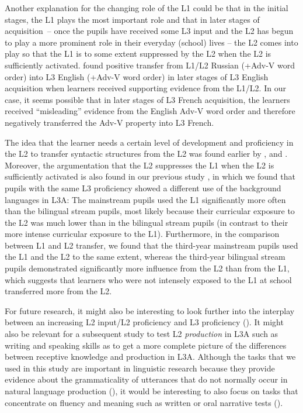 \documentclass[output=paper]{langsci/langscibook}
\begin{document}
Another explanation for the changing role of the L1 could be that in the initial stages, the L1 plays the most important role and that in later stages of acquisition~– once the pupils have received some L3 input and the L2 has begun to play a more prominent role in their everyday (school) lives – the L2 comes into play so that the L1 is to some extent suppressed by the L2 when the L2 is sufficiently activated. \citet{WestergaardEtAl2016} found positive transfer from L1/L2 Russian (+Adv-V word order) into L3 English (+Adv-V word order) in later stages of L3 English acquisition when learners received supporting evidence from the L1/L2. In our case, it seems possible that in later stages of L3 French acquisition, the learners received ``misleading'' evidence from the English Adv-V word order and therefore negatively transferred the Adv-V property into L3 French.

The idea that the learner needs a certain level of development and proficiency in the L2 to transfer syntactic structures from the L2 was found earlier by \citet{BardelFalk2007}, \citet{SánchezBardel2017} and . Moreover, the argumentation that the L2 suppresses the L1 when the L2 is sufficiently activated is also found in our previous study \citep{StadtEtAl2016}, in which we found that pupils with the same L3 proficiency showed a different use of the background languages in L3A: The mainstream pupils used the L1 significantly more often than the bilingual stream pupils, most likely because their curricular exposure to the L2 was much lower than in the bilingual stream pupils (in contrast to their more intense curricular exposure to the L1). Furthermore, in the comparison between L1 and L2 transfer, we found that the third-year mainstream pupils used the L1 and the L2 to the same extent, whereas the third-year bilingual stream pupils demonstrated significantly more influence from the L2 than from the L1, which suggests that learners who were not intensely exposed to the L1 at school transferred more from the L2.

For future research, it might also be interesting to look further into the interplay between an increasing L2 input/L2 proficiency and L3 proficiency (\citealt{BardelLindqvist2007, SánchezBardel2017}). It might also be relevant for a subsequent study to test L2 \textit{production} in L3A such as writing and speaking skills as to get a more complete picture of the differences between receptive knowledge and production in L3A. Although the tasks that we used in this study are important in linguistic research because they provide evidence about the grammaticality of utterances that do not normally occur in natural language production (\citealt{SchützeSprouse2014}), it would be interesting to also focus on tasks that concentrate on fluency and meaning such as written or oral narrative tests (\citealt{EllisR2005, EllisR2009}).
\end{document}
